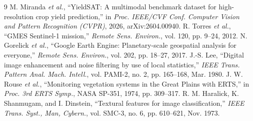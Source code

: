 \documentclass[conference]{IEEEtran}
\begin{document}
\begin{thebibliography}{9}
 M. Miranda \textit{et al.}, ``YieldSAT: A multimodal benchmark dataset for high-resolution crop yield prediction,'' in \textit{Proc. IEEE/CVF Conf. Computer Vision and Pattern Recognition (CVPR)}, 2026, arXiv:2604.00940.
 R. Torres \textit{et al.}, ``GMES Sentinel-1 mission,'' \textit{Remote Sens. Environ.}, vol. 120, pp. 9--24, 2012.
 N. Gorelick \textit{et al.}, ``Google Earth Engine: Planetary-scale geospatial analysis for everyone,'' \textit{Remote Sens. Environ.}, vol. 202, pp. 18--27, 2017.
 J.-S. Lee, ``Digital image enhancement and noise filtering by use of local statistics,'' \textit{IEEE Trans. Pattern Anal. Mach. Intell.}, vol. PAMI-2, no. 2, pp. 165--168, Mar. 1980.
 J. W. Rouse \textit{et al.}, ``Monitoring vegetation systems in the Great Plains with ERTS,'' in \textit{Proc. 3rd ERTS Symp.}, NASA SP-351, 1974, pp. 309--317.
 R. M. Haralick, K. Shanmugam, and I. Dinstein, ``Textural features for image classification,'' \textit{IEEE Trans. Syst., Man, Cybern.}, vol. SMC-3, no. 6, pp. 610--621, Nov. 1973.
\end{thebibliography}
\end{document}
